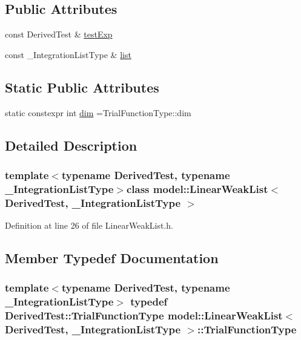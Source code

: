 \subsection*{Public Attributes}
\begin{DoxyCompactItemize}
\item 
const Derived\+Test \& \hyperlink{classmodel_1_1_linear_weak_list_a1bf96a167a75ffd4f7ffd1793b7a8c63}{test\+Exp}
\item 
const \+\_\+\+Integration\+List\+Type \& \hyperlink{classmodel_1_1_linear_weak_list_a9f0a5bda6e996b30499b54af9f4fd55f}{list}
\end{DoxyCompactItemize}
\subsection*{Static Public Attributes}
\begin{DoxyCompactItemize}
\item 
static constexpr int \hyperlink{classmodel_1_1_linear_weak_list_aad3d37cb5be7d35e2e9fffd95a89008a}{dim} =Trial\+Function\+Type\+::dim
\end{DoxyCompactItemize}


\subsection{Detailed Description}
\subsubsection*{template$<$typename Derived\+Test, typename \+\_\+\+Integration\+List\+Type$>$class model\+::\+Linear\+Weak\+List$<$ Derived\+Test, \+\_\+\+Integration\+List\+Type $>$}



Definition at line 26 of file Linear\+Weak\+List.\+h.



\subsection{Member Typedef Documentation}
\hypertarget{classmodel_1_1_linear_weak_list_ab47b0154ac5d860c652b676bfc0c7c8b}{}
\subsubsection[{Trial\+Function\+Type}]{\setlength{\rightskip}{0pt plus 5cm}template$<$typename Derived\+Test, typename \+\_\+\+Integration\+List\+Type$>$ typedef Derived\+Test\+::\+Trial\+Function\+Type {\bf model\+::\+Linear\+Weak\+List}$<$ Derived\+Test, \+\_\+\+Integration\+List\+Type $>$\+::{\bf Trial\+Function\+Type}}\label{classmodel_1_1_linear_weak_list_ab47b0154ac5d860c652b676bfc0c7c8b}


